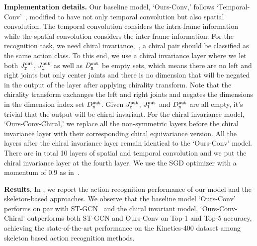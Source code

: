 \documentclass{article}
\begin{document}
\textbf{Implementation details.} Our baseline model, `Ours-Conv,' follows `Temporal-Conv'~\cite{kim2017interpretable}, modified  to have not only temporal convolution but also spatial convolution. The temporal convolution considers the intra-frame information while the spatial convolution considers the inter-frame information. For the recognition task, we need chiral invariance,~\ie, a chiral pair should be classified as the same action class. To this end, we use a chiral invariance layer where we let both $J^{\tt out}_{\tt r}$, $J^{\tt out}_{\tt l}$ as well as $D^{\tt out}_{\tt n}$  be empty sets, which means there are no left and right joints but only center joints and there is no dimension that will be negated in the output of the layer after applying chirality transform. Note that the chirality transform exchanges the left and right joints and negates the dimensions in the dimension index set $D^{\tt out}_{\tt n}$. Given $J^{\tt out}_{\tt r}$, $J^{\tt out}_{\tt l}$ and $D^{\tt out}_{\tt n}$ are all empty, it's trivial that the output will be chiral invariant. For the chiral invariance model, `Ours-Conv-Chiral,' we replace  all the non-symmetric layers before the chiral invariance layer with their corresponding chiral equivariance version. All the layers after the chiral invariance layer remain identical to the `Ours-Conv' model. There are in total 10 layers of spatial and temporal convolution and we put the chiral invariance layer at the fourth layer. We use the SGD optimizer with a momentum of $0.9$ as in~\cite{yan2018stgcn}. 

\textbf{Results.} In , we report the action recognition performance of our model and the skeleton-based approaches. We observe that the baseline model `Ours-Conv'  performs on par with ST-GCN~\cite{yan2018stgcn} and the chiral invariant model, `Ours-Conv-Chiral' outperforms both ST-GCN and Ours-Conv on Top-1 and Top-5 accuracy, achieving the state-of-the-art performance on the Kinetics-400 dataset among skeleton based action recognition methods. 
\end{document}
